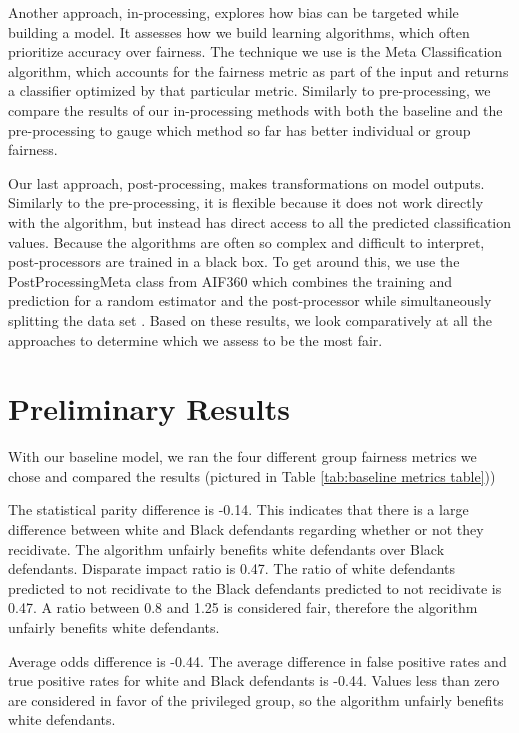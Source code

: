 \documentclass[water,article,submit,moreauthors,pdftex]{mdpi}
\begin{document}
Another approach, in-processing, explores how bias can be targeted while
building a model. It assesses how we build learning algorithms, which
often prioritize accuracy over fairness. The technique we use is the
Meta Classification algorithm, which accounts for the fairness metric as
part of the input and returns a classifier optimized by that particular
metric. Similarly to pre-processing, we compare the results of our
in-processing methods with both the baseline and the pre-processing to
gauge which method so far has better individual or group fairness.

Our last approach, post-processing, makes transformations on model
outputs. Similarly to the pre-processing, it is flexible because it does
not work directly with the algorithm, but instead has direct access to
all the predicted classification values. Because the algorithms are
often so complex and difficult to interpret, post-processors are trained
in a black box. To get around this, we use the PostProcessingMeta class
from AIF360 which combines the training and prediction for a random
estimator and the post-processor while simultaneously splitting the data
set \citep{aif360-oct-2018}. Based on these results, we look
comparatively at all the approaches to determine which we assess to be
the most fair.

\hypertarget{preliminary-results}{%
\section{Preliminary Results}\label{preliminary-results}}

With our baseline model, we ran the four different group fairness
metrics we chose and compared the results (pictured in Table
\ref{tab:baseline metrics table}))

The statistical parity difference is -0.14. This indicates that there is
a large difference between white and Black defendants regarding whether
or not they recidivate. The algorithm unfairly benefits white defendants
over Black defendants. Disparate impact ratio is 0.47. The ratio of
white defendants predicted to not recidivate to the Black defendants
predicted to not recidivate is 0.47. A ratio between 0.8 and 1.25 is
considered fair, therefore the algorithm unfairly benefits white
defendants.

Average odds difference is -0.44. The average difference in false
positive rates and true positive rates for white and Black defendants is
-0.44. Values less than zero are considered in favor of the privileged
group, so the algorithm unfairly benefits white defendants.
\end{document}
